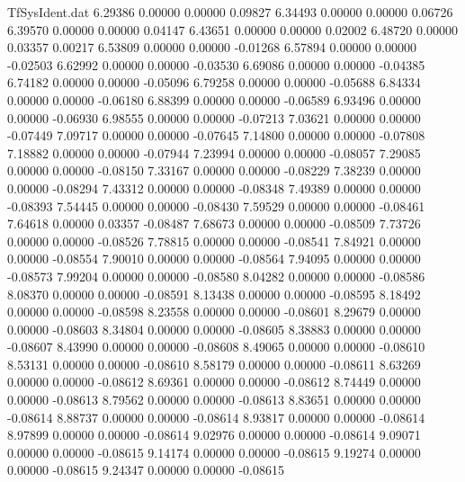 \begin{filecontents}{TfSysIdent.dat}
   6.29386    0.00000    0.00000    0.09827
   6.34493    0.00000    0.00000    0.06726
   6.39570    0.00000    0.00000    0.04147
   6.43651    0.00000    0.00000    0.02002
   6.48720    0.00000    0.03357    0.00217
   6.53809    0.00000    0.00000   -0.01268
   6.57894    0.00000    0.00000   -0.02503
   6.62992    0.00000    0.00000   -0.03530
   6.69086    0.00000    0.00000   -0.04385
   6.74182    0.00000    0.00000   -0.05096
   6.79258    0.00000    0.00000   -0.05688
   6.84334    0.00000    0.00000   -0.06180
   6.88399    0.00000    0.00000   -0.06589
   6.93496    0.00000    0.00000   -0.06930
   6.98555    0.00000    0.00000   -0.07213
   7.03621    0.00000    0.00000   -0.07449
   7.09717    0.00000    0.00000   -0.07645
   7.14800    0.00000    0.00000   -0.07808
   7.18882    0.00000    0.00000   -0.07944
   7.23994    0.00000    0.00000   -0.08057
   7.29085    0.00000    0.00000   -0.08150
   7.33167    0.00000    0.00000   -0.08229
   7.38239    0.00000    0.00000   -0.08294
   7.43312    0.00000    0.00000   -0.08348
   7.49389    0.00000    0.00000   -0.08393
   7.54445    0.00000    0.00000   -0.08430
   7.59529    0.00000    0.00000   -0.08461
   7.64618    0.00000    0.03357   -0.08487
   7.68673    0.00000    0.00000   -0.08509
   7.73726    0.00000    0.00000   -0.08526
   7.78815    0.00000    0.00000   -0.08541
   7.84921    0.00000    0.00000   -0.08554
   7.90010    0.00000    0.00000   -0.08564
   7.94095    0.00000    0.00000   -0.08573
   7.99204    0.00000    0.00000   -0.08580
   8.04282    0.00000    0.00000   -0.08586
   8.08370    0.00000    0.00000   -0.08591
   8.13438    0.00000    0.00000   -0.08595
   8.18492    0.00000    0.00000   -0.08598
   8.23558    0.00000    0.00000   -0.08601
   8.29679    0.00000    0.00000   -0.08603
   8.34804    0.00000    0.00000   -0.08605
   8.38883    0.00000    0.00000   -0.08607
   8.43990    0.00000    0.00000   -0.08608
   8.49065    0.00000    0.00000   -0.08610
   8.53131    0.00000    0.00000   -0.08610
   8.58179    0.00000    0.00000   -0.08611
   8.63269    0.00000    0.00000   -0.08612
   8.69361    0.00000    0.00000   -0.08612
   8.74449    0.00000    0.00000   -0.08613
   8.79562    0.00000    0.00000   -0.08613
   8.83651    0.00000    0.00000   -0.08614
   8.88737    0.00000    0.00000   -0.08614
   8.93817    0.00000    0.00000   -0.08614
   8.97899    0.00000    0.00000   -0.08614
   9.02976    0.00000    0.00000   -0.08614
   9.09071    0.00000    0.00000   -0.08615
   9.14174    0.00000    0.00000   -0.08615
   9.19274    0.00000    0.00000   -0.08615
   9.24347    0.00000    0.00000   -0.08615

\end{filecontents}
